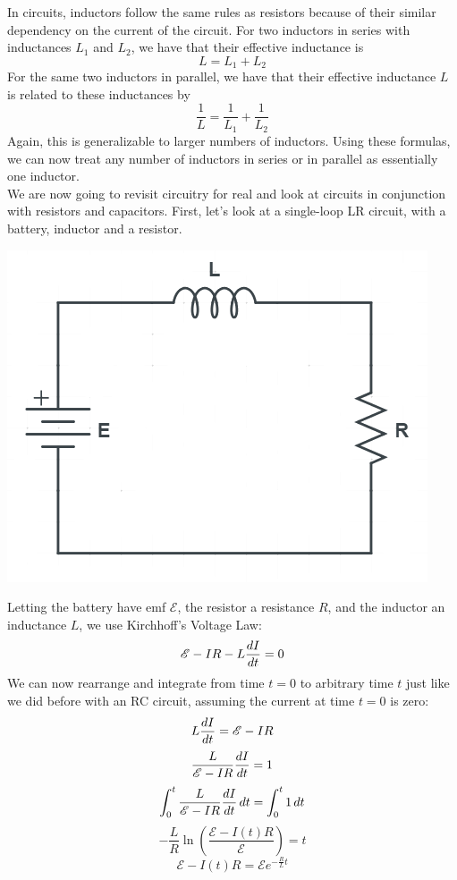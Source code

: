 In circuits, inductors follow the same rules as resistors because of their similar dependency on the current of the circuit. For two inductors in series with inductances $L_1$ and $L_2$, we have that their effective inductance is 
\[
	L = L_1 + L_2
\]
For the same two inductors in parallel, we have that their effective inductance $L$ is related to these inductances by
\[
	\frac{1}{L} = \frac{1}{L_1} + \frac{1}{L_2}
\]
Again, this is generalizable to larger numbers of inductors. Using these formulas, we can now treat any number of inductors in series or in parallel as essentially one inductor. \\
We are now going to revisit circuitry for real and look at circuits in conjunction with resistors and capacitors. First, let's look at a single-loop LR circuit, with a battery, inductor and a resistor.
\begin{center}
	\includegraphics[scale=0.25]{images/em/LR-circuit.png}
\end{center}
Letting the battery have emf $\mathscr{E}$, the resistor a resistance $R$, and the inductor an inductance $L$, we use Kirchhoff's Voltage Law:
\[
	\mathscr{E} - IR - L\frac{d I}{d t} = 0
\]
We can now rearrange and integrate from time $t=0$ to arbitrary time $t$ just like we did before with an RC circuit, assuming the current at time $t=0$ is zero:\\
\[
	L\frac{d I}{d t} = \mathscr{E} - IR
\]
\[
	\frac{L}{\mathscr{E} - IR} \frac{d I}{d t}  = 1
\]
\[
	\int_0^t \frac{L}{\mathscr{E} - IR} \frac{d I}{d t} \, dt =  \int_0^t 1 \, dt
\]
\[
	-\frac{L}{R} \ln\left(\frac{\mathscr{E} - I(t)R}{\mathscr{E}}\right) = t
\]
\[
	\mathscr{E} - I(t)R = \mathscr{E}e^{-\frac{R}{L}t}
\]
